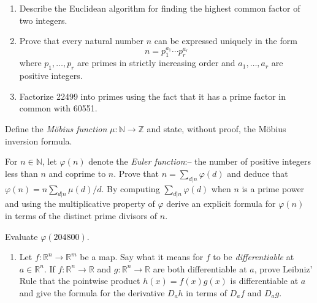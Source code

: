 \documentclass{exams}
\newcommand{\R}{\mathbb{R}}
\newcommand{\N}{\mathbb{N}}
\newcommand{\Z}{\mathbb{Z}}
\begin{document}

\begin{exam}
\begin{question}
\begin{enumerate}
\item Describe the Euclidean algorithm for finding the
highest common factor of two integers.

\newpage

\item Prove that every natural number $n$ can be expressed
uniquely in the form
$$
n=p_1^{a_1}\cdots p_r^{a_r}
$$
where $p_1,\ldots,p_r$ are primes in strictly increasing order
and $a_1,\ldots,a_r$ are positive integers.

\newpage

\item Factorize 22499 into primes using the fact that it has a
prime factor in common with 60551.
\end{enumerate}
\end{question}

\begin{question}
Define the {\it M\"obius function} $\mu \colon \N \to \Z$
and state, without proof, the M\"obius inversion formula.

For $n \in \N$, let $\varphi(n)$ denote the {\it Euler
function}:-- the number of positive integers less than $n$ and coprime
to $n$. Prove that $n= \displaystyle{\sum_{d\vert n}} \varphi(d)$ and
deduce that $\varphi(n) = n\displaystyle{\sum_{d\vert n}} \mu(d)/d$.
By computing $\displaystyle{\sum_{d\vert n}} \varphi(d)$ when $n$ is a
prime power and using the multiplicative property of $\varphi$ derive
an explicit formula for $\varphi(n)$ in terms of the distinct prime
divisors of $n$.

Evaluate $\varphi(204800)$.
\end{question}

\newpage

\begin{question}
\begin{enumerate}
\item Let $f \colon \R^n \to \R^m$ be a map. Say what it means for $f$ to be
\textit{differentiable} at $a \in \R^n$. If $f \colon \R^n \to \R$ and
$g \colon \R^n \to \R$ are both differentiable at $a$, prove Leibniz'
Rule that the pointwise product $h(x) = f(x)g(x)$ is differentiable at
$a$ and give the formula for the derivative $D_ah$ in terms of $D_af$
and $D_ag$.


\end{enumerate}
\end{question}
\end{exam}
\end{document}

